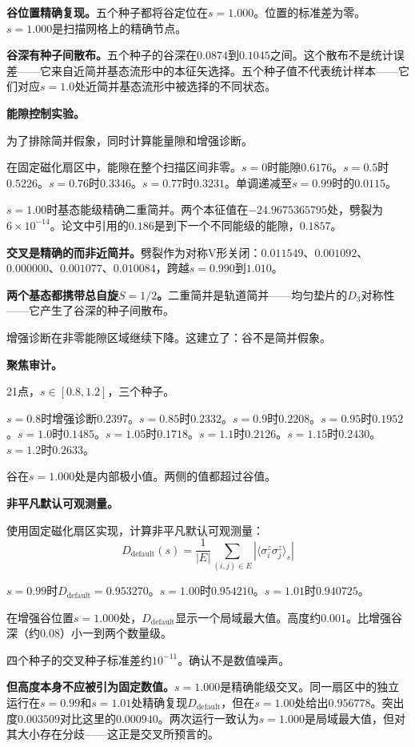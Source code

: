 \documentclass[11pt,a4paper]{book}
\theoremstyle{definition}
\begin{document}
\textbf{谷位置精确复现。}五个种子都将谷定位在$s=1.000$。位置的标准差为零。$s=1.000$是扫描网格上的精确节点。

\textbf{谷深有种子间散布。}五个种子的谷深在$0.0874$到$0.1045$之间。这个散布不是统计误差——它来自近简并基态流形中的本征矢选择。五个种子值不代表统计样本——它们对应$s=1.0$处近简并基态流形中被选择的不同状态。

\textbf{能隙控制实验。}

为了排除简并假象，同时计算能量隙和增强诊断。

在固定磁化扇区中，能隙在整个扫描区间非零。$s=0$时能隙$0.6176$。$s=0.5$时$0.5226$。$s=0.76$时$0.3346$。$s=0.77$时$0.3231$。单调递减至$s=0.99$时的$0.0115$。

$s=1.00$时基态能级精确二重简并。两个本征值在$-24.9675365795$处，劈裂为$6\times10^{-14}$。论文中引用的$0.186$是到下一个不同能级的能隙，$0.1857$。

\textbf{交叉是精确的而非近简并。}劈裂作为对称V形关闭：$0.011549$、$0.001092$、$0.000000$、$0.001077$、$0.010084$，跨越$s=0.990$到$1.010$。

\textbf{两个基态都携带总自旋$S=1/2$。}二重简并是轨道简并——均匀垫片的$D_3$对称性——它产生了谷深的种子间散布。

增强诊断在非零能隙区域继续下降。这建立了：谷不是简并假象。

\textbf{聚焦审计。}

21点，$s\in[0.8, 1.2]$，三个种子。

$s=0.8$时增强诊断$0.2397$。$s=0.85$时$0.2332$。$s=0.9$时$0.2208$。$s=0.95$时$0.1952$。$s=1.0$时$0.1485$。$s=1.05$时$0.1718$。$s=1.1$时$0.2126$。$s=1.15$时$0.2430$。$s=1.2$时$0.2633$。

谷在$s=1.000$处是内部极小值。两侧的值都超过谷值。

\textbf{非平凡默认可观测量。}

使用固定磁化扇区实现，计算非平凡默认可观测量：
\begin{equation}
D_{\text{default}}(s) = \frac{1}{|E|}\sum_{(i,j)\in E}|\langle\sigma_i^z\sigma_j^z\rangle_s|
\end{equation}

$s=0.99$时$D_{\text{default}}=0.953270$。$s=1.00$时$0.954210$。$s=1.01$时$0.940725$。

在增强谷位置$s=1.000$处，$D_{\text{default}}$显示一个局域最大值。高度约$0.001$。比增强谷深（约$0.08$）小一到两个数量级。

四个种子的交叉种子标准差约$10^{-11}$。确认不是数值噪声。

\textbf{但高度本身不应被引为固定数值。}$s=1.000$是精确能级交叉。同一扇区中的独立运行在$s=0.99$和$s=1.01$处精确复现$D_{\text{default}}$，但在$s=1.00$处给出$0.956778$。突出度$0.003509$对比这里的$0.000940$。两次运行一致认为$s=1.000$是局域最大值，但对其大小存在分歧——这正是交叉所预言的。
\end{document}
